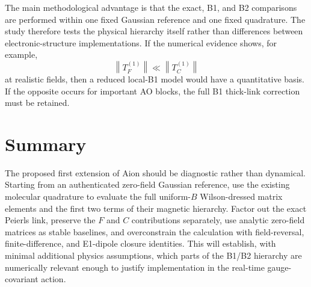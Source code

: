 \documentclass[11pt]{article}
\newcommand{\norm}[1]{\left\lVert #1\right\rVert}
\begin{document}
The main methodological advantage is that the exact, B1, and B2 comparisons are performed within one fixed Gaussian reference and one fixed quadrature.  The study therefore tests the physical hierarchy itself rather than differences between electronic-structure implementations.  If the numerical evidence shows, for example,
\begin{equation}
\norm{T_F^{(1)}}\ll\norm{T_C^{(1)}}
\end{equation}
at realistic fields, then a reduced local-B1 model would have a quantitative basis.  If the opposite occurs for important AO blocks, the full B1 thick-link correction must be retained.

\section{Summary}

The proposed first extension of Aion should be diagnostic rather than dynamical.  Starting from an authenticated zero-field Gaussian reference, use the existing molecular quadrature to evaluate the full uniform-$B$ Wilson-dressed matrix elements and the first two terms of their magnetic hierarchy.  Factor out the exact Peierls link, preserve the $F$ and $C$ contributions separately, use analytic zero-field matrices as stable baselines, and overconstrain the calculation with field-reversal, finite-difference, and E1-dipole closure identities.  This will establish, with minimal additional physics assumptions, which parts of the B1/B2 hierarchy are numerically relevant enough to justify implementation in the real-time gauge-covariant action.
\end{document}
